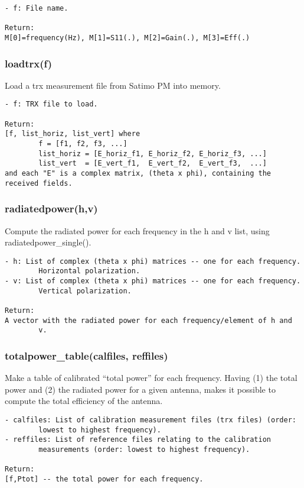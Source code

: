 \begin{verbatim}
- f: File name.

Return:
M[0]=frequency(Hz), M[1]=S11(.), M[2]=Gain(.), M[3]=Eff(.)
\end{verbatim}

\subsubsection{loadtrx(f)}
Load a trx measurement file from Satimo PM into memory. 

\begin{verbatim}
- f: TRX file to load.

Return:
[f, list_horiz, list_vert] where
        f = [f1, f2, f3, ...]
        list_horiz = [E_horiz_f1, E_horiz_f2, E_horiz_f3, ...]
        list_vert  = [E_vert_f1,  E_vert_f2,  E_vert_f3,  ...]
and each "E" is a complex matrix, (theta x phi), containing the received fields.
\end{verbatim}

\subsubsection{radiatedpower(h,v)}
Compute the radiated power for each frequency in the h and v list, using
radiatedpower\_single().

\begin{verbatim}
- h: List of complex (theta x phi) matrices -- one for each frequency.
        Horizontal polarization.
- v: List of complex (theta x phi) matrices -- one for each frequency.
        Vertical polarization.

Return:
A vector with the radiated power for each frequency/element of h and
        v.
\end{verbatim}

\subsubsection{totalpower\_table(calfiles, reffiles)}
Make a table of calibrated ``total power'' for each frequency.
Having (1) the total power and (2) the radiated power for a given antenna,
makes it possible to compute the total efficiency of the antenna.

\begin{verbatim}
- calfiles: List of calibration measurement files (trx files) (order:
        lowest to highest frequency).
- reffiles: List of reference files relating to the calibration
        measurements (order: lowest to highest frequency).

Return:
[f,Ptot] -- the total power for each frequency.
\end{verbatim}

